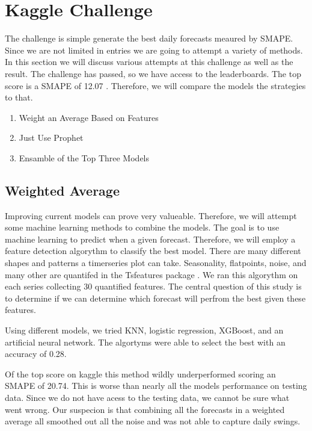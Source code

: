 \documentclass[16pt,twocolumn,letterpaper]{article}
\begin{document}
\section{Kaggle Challenge}

The challenge is simple generate the best daily forecasts meaured by SMAPE. Since we are not limited in entries we are going to attempt a variety of methods. In this section we will discuss various attempts at this challenge as well as the result. The challenge has passed, so we have access to the leaderboards. The top score is a SMAPE of 12.07 \cite{kaggle}. Therefore, we will compare the models the strategies to that. 

\begin{enumerate}
\item Weight an Average Based on Features
\item Just Use Prophet
\item Ensamble of the Top Three Models
\end{enumerate}

\subsection{Weighted Average}

Improving current models can prove very valueable. Therefore, we will attempt some machine learning methods to combine the models. The goal is to use machine learning to predict when a given forecast. Therefore, we will employ a feature detection algorythm to classify the best model. There are many different shapes and patterns a timerseries plot can take. Seasonality, flatpoints, noise, and many other are quantifed in the Tsfeatures package \cite{montero2020fforma}. We ran this algorythm on each series collecting 30 quantified features. The central question of this study is to determine if we can determine which forecast will perfrom the best given these features. 

Using different models, we tried KNN, logistic regression, XGBoost, and an artificial neural network. The algortyms were able to select the best with an accuracy of 0.28.

Of the top score on kaggle this method wildly underperformed scoring an SMAPE of 20.74. This is worse than nearly all the models performance on testing data. Since we do not have acess to the testing data, we cannot be sure what went wrong. Our suspecion is that combining all the forecasts in a weighted average all smoothed out all the noise and was not able to capture daily swings.
\end{document}
